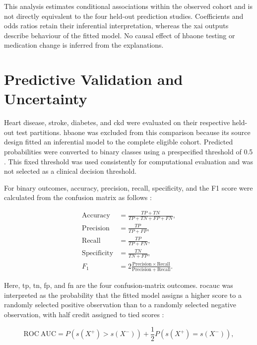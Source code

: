 This analysis estimates conditional associations within the observed cohort and is not directly equivalent to the four held-out prediction studies. Coefficients and odds ratios retain their inferential interpretation, whereas the \gls{xai} outputs describe behaviour of the fitted model. No causal effect of \gls{hbaone} testing or medication change is inferred from the explanations.

\section{Predictive Validation and Uncertainty}

Heart disease, stroke, diabetes, and \gls{ckd} were evaluated on their respective held-out test partitions. \gls{hbaone} was excluded from this comparison because its source design fitted an inferential model to the complete eligible cohort. Predicted probabilities were converted to binary classes using a prespecified threshold of 0.5 \citep{hernandez-orallo_unified_2012}. This fixed threshold was used consistently for computational evaluation and was not selected as a clinical decision threshold.

For binary outcomes, accuracy, precision, recall, specificity, and the F1 score were calculated from the confusion matrix as follows \citep{powers_evaluation_2011}:

\begin{align}
\mathrm{Accuracy}
    &= \frac{TP+TN}{TP+TN+FP+FN}, \\
\mathrm{Precision}
    &= \frac{TP}{TP+FP}, \\
\mathrm{Recall}
    &= \frac{TP}{TP+FN}, \\
\mathrm{Specificity}
    &= \frac{TN}{TN+FP}, \\
F_1
    &= 2\frac{\mathrm{Precision}\times\mathrm{Recall}}
    {\mathrm{Precision}+\mathrm{Recall}}.
\end{align}

Here, \gls{tp}, \gls{tn}, \gls{fp}, and \gls{fn} are the four confusion-matrix outcomes. \gls{rocauc} was interpreted as the probability that the fitted model assigns a higher score to a randomly selected positive observation than to a randomly selected negative observation, with half credit assigned to tied scores \citep{fawcett_introduction_2006}:

\begin{equation}
\mathrm{ROC\ AUC}
=
P\left(s(X^{+}) > s(X^{-})\right)
+
\frac{1}{2}
P\left(s(X^{+}) = s(X^{-})\right),
\end{equation}

